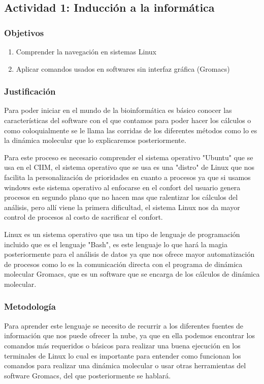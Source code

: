 \documentclass[a4paper,12pt]{article}
\begin{document}
    \subsection{Actividad 1: Inducción a la informática}

        \subsubsection {Objetivos}
            \begin{enumerate}
                \item Comprender la navegación en sistemas Linux
                \item Aplicar comandos usados en softwares sin interfaz gráfica (Gromacs)
            \end{enumerate}

        \subsubsection {Justificación}
        Para poder iniciar en el mundo de la bioinformática es básico conocer las características del software con el que contamos para poder hacer los cálculos o como coloquialmente se le llama las corridas de los diferentes métodos como lo es la dinámica molecular que lo explicaremos posteriormente. 

        Para este proceso es necesario comprender el sistema operativo "Ubuntu" que se usa en el CIIM, el sistema operativo que se usa es una "distro" de Linux que nos facilita la personalización de prioridades en cuanto a procesos ya que si usamos windows este sistema operativo al enfocarse en el confort del usuario genera procesos en segundo plano que no hacen mas que ralentizar los cálculos del análisis, pero allí viene la primera dificultad, el sistema Linux nos da mayor control de procesos al costo de sacrificar el confort.
    
        Linux es un sistema operativo que usa un tipo de lenguaje de programación incluido que es el lenguaje "Bash", es este lenguaje lo que hará la magia posteriormente para el análisis de datos ya que nos ofrece mayor automatización de procesos como lo es la comunicación directa con el programa de dinámica molecular Gromacs, que es un software que se encarga de  los cálculos de dinámica molecular.

        \subsubsection {Metodología}
        Para aprender este lenguaje se necesito de recurrir a los diferentes fuentes de información que nos puede ofrecer la nube, ya que en ella podemos encontrar los comandos más requeridos o básicos para realizar una buena ejecución en los terminales de Linux lo cual es importante para entender como funcionan los comandos para realizar una dinámica molecular o usar otras herramientas del software Gromacs, del que posteriormente se hablará.
        
\end{document}
